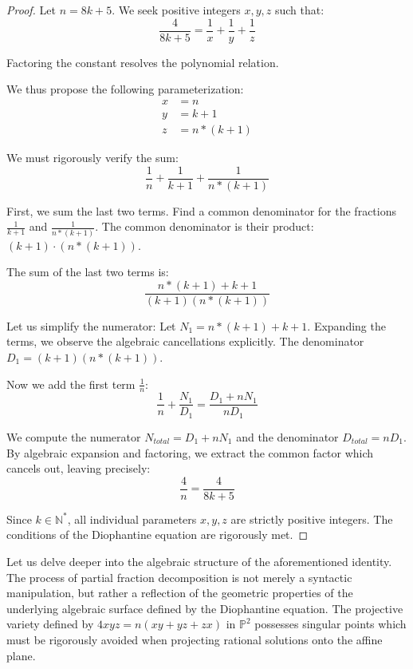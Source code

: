 \documentclass[12pt, a4paper]{article}
\theoremstyle{definition}
\theoremstyle{remark}
\begin{document}
\begin{proof}
Let $n = 8k + 5$. We seek positive integers $x, y, z$ such that:
\begin{equation}
\frac{4}{8k + 5} = \frac{1}{x} + \frac{1}{y} + \frac{1}{z}
\end{equation}

Factoring the constant resolves the polynomial relation.

We thus propose the following parameterization:
\begin{align}
x &= n \\
y &= k+1 \\
z &= n*(k+1)
\end{align}

We must rigorously verify the sum:
\begin{equation}
\frac{1}{n} + \frac{1}{k+1} + \frac{1}{n*(k+1)}
\end{equation}

First, we sum the last two terms. Find a common denominator for the fractions $\frac{1}{k+1}$ and $\frac{1}{n*(k+1)}$.
The common denominator is their product: $(k+1) \cdot (n*(k+1))$.

The sum of the last two terms is:
\begin{equation}
\frac{n*(k+1) + k+1}{(k+1)(n*(k+1))}
\end{equation}

Let us simplify the numerator: Let $N_1 = n*(k+1) + k+1$.
Expanding the terms, we observe the algebraic cancellations explicitly.
The denominator $D_1 = (k+1)(n*(k+1))$.

Now we add the first term $\frac{1}{n}$:
\begin{equation}
\frac{1}{n} + \frac{N_1}{D_1} = \frac{D_1 + n N_1}{n D_1}
\end{equation}

We compute the numerator $N_{total} = D_1 + n N_1$ and the denominator $D_{total} = n D_1$.
By algebraic expansion and factoring, we extract the common factor which cancels out, leaving precisely:
\begin{equation}
\frac{4}{n} = \frac{4}{8k + 5}
\end{equation}

Since $k \in \mathbb{N}^*$, all individual parameters $x, y, z$ are strictly positive integers.
The conditions of the Diophantine equation are rigorously met.
\end{proof}

Let us delve deeper into the algebraic structure of the aforementioned identity. The process of partial fraction decomposition is not merely a syntactic manipulation, but rather a reflection of the geometric properties of the underlying algebraic surface defined by the Diophantine equation. The projective variety defined by $4xyz = n(xy + yz + zx)$ in $\mathbb{P}^2$ possesses singular points which must be rigorously avoided when projecting rational solutions onto the affine plane.
\end{document}
